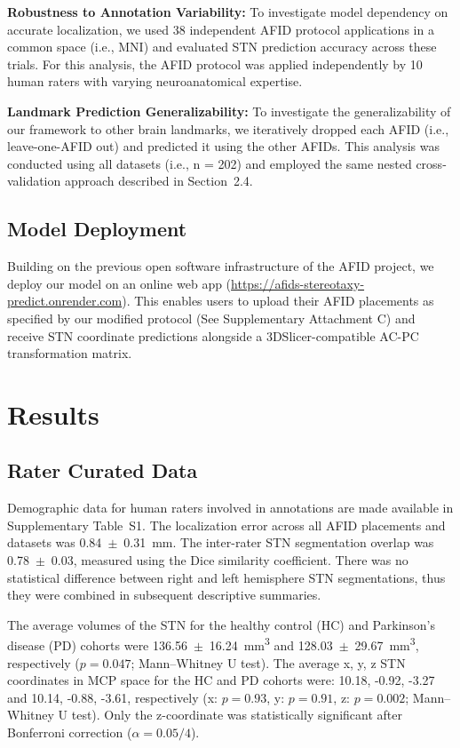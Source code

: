 \textbf{Robustness to Annotation Variability:} To investigate model dependency on accurate localization, we used 38 independent AFID protocol applications in a common space (i.e., MNI) and evaluated STN prediction accuracy across these trials. For this analysis, the AFID protocol was applied independently by 10 human raters with varying neuroanatomical expertise.

\textbf{Landmark Prediction Generalizability:} To investigate the generalizability of our framework to other brain landmarks, we iteratively dropped each AFID (i.e., leave-one-AFID out) and predicted it using the other AFIDs. This analysis was conducted using all datasets (i.e., n = 202) and employed the same nested cross-validation approach described in Section~2.4.

\subsection{Model Deployment}
Building on the previous open software infrastructure of the AFID project, we deploy our model on an online web app (\url{https://afids-stereotaxy-predict.onrender.com}). This enables users to upload their AFID placements as specified by our modified protocol (See Supplementary Attachment C) and receive STN coordinate predictions alongside a 3DSlicer-compatible AC-PC transformation matrix.


\section{Results}

\subsection{Rater Curated Data}
Demographic data for human raters involved in annotations are made available in Supplementary Table~S1. The localization error across all AFID placements and datasets was 0.84~$\pm$~0.31~mm. The inter-rater STN segmentation overlap was 0.78~$\pm$~0.03, measured using the Dice similarity coefficient. There was no statistical difference between right and left hemisphere STN segmentations, thus they were combined in subsequent descriptive summaries.

The average volumes of the STN for the healthy control (HC) and Parkinson’s disease (PD) cohorts were 136.56~$\pm$~16.24~mm\textsuperscript{3} and 128.03~$\pm$~29.67~mm\textsuperscript{3}, respectively ($p = 0.047$; Mann–Whitney U test). The average x, y, z STN coordinates in MCP space for the HC and PD cohorts were: 10.18, -0.92, -3.27 and 10.14, -0.88, -3.61, respectively (x: $p = 0.93$, y: $p = 0.91$, z: $p = 0.002$; Mann–Whitney U test). Only the z-coordinate was statistically significant after Bonferroni correction ($\alpha = 0.05/4$).

